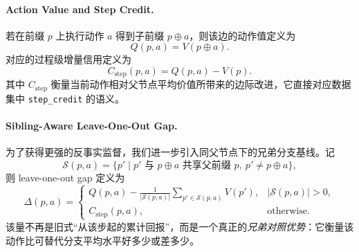 \paragraph{Action Value and Step Credit.}
若在前缀 $p$ 上执行动作 $a$ 得到子前缀 $p\oplus a$，则该边的动作值定义为
\begin{equation}
    Q(p,a) = V(p \oplus a).
    \label{eq:action_value}
\end{equation}
对应的过程级增量信用定义为
\begin{equation}
    C_{\text{step}}(p,a) = Q(p,a) - V(p).
    \label{eq:step_credit}
\end{equation}
其中 $C_{\text{step}}$ 衡量当前动作相对父节点平均价值所带来的边际改进，它直接对应数据集中 \texttt{step\_credit} 的语义。

\paragraph{Sibling-Aware Leave-One-Out Gap.}
为了获得更强的反事实监督，我们进一步引入同父节点下的兄弟分支基线。记
\begin{equation}
    \mathcal{S}(p,a)=\{p' \mid p' \text{ 与 } p\oplus a \text{ 共享父前缀 } p,\ p'\neq p\oplus a\},
\end{equation}
则 leave-one-out gap 定义为
\begin{equation}
    \Delta(p,a)=
    \begin{cases}
        Q(p,a)-\frac{1}{|\mathcal{S}(p,a)|}\sum_{p' \in \mathcal{S}(p,a)}V(p'), & |\mathcal{S}(p,a)|>0,\\
        C_{\text{step}}(p,a), & \text{otherwise}.
    \end{cases}
    \label{eq:loo_gap}
\end{equation}
该量不再是旧式“从该步起的累计回报”，而是一个真正的\emph{兄弟对照优势}：它衡量该动作比可替代分支平均水平好多少或差多少。

